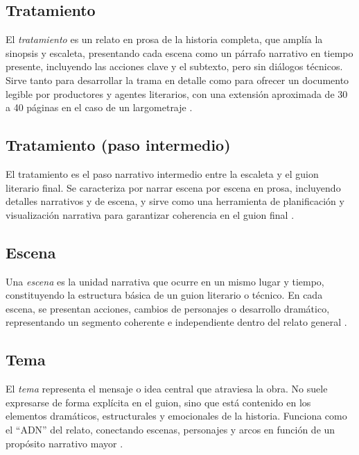 \documentclass[12pt]{article}
\begin{document}
	\subsection{Tratamiento}

	El \textit{tratamiento} es un relato en prosa de la historia completa, que amplía la sinopsis y escaleta, presentando cada escena como un párrafo narrativo en tiempo presente, incluyendo las acciones clave y el subtexto, pero sin diálogos técnicos. Sirve tanto para desarrollar la trama en detalle como para ofrecer un documento legible por productores y agentes literarios, con una extensión aproximada de 30 a 40 páginas en el caso de un largometraje \parencite{revista24cuadros_tratamiento,tratamiento_wikipedia}.

	\subsection{Tratamiento (paso intermedio)}

	El tratamiento es el paso narrativo intermedio entre la escaleta y el guion literario final. Se caracteriza por narrar escena por escena en prosa, incluyendo detalles narrativos y de escena, y sirve como una herramienta de planificación y visualización narrativa para garantizar coherencia en el guion final \parencite{unir_escaleta_tratamiento,tratamiento_wikipedia}.

	\subsection{Escena}

	Una \textit{escena} es la unidad narrativa que ocurre en un mismo lugar y tiempo, constituyendo la estructura básica de un guion literario o técnico. En cada escena, se presentan acciones, cambios de personajes o desarrollo dramático, representando un segmento coherente e independiente dentro del relato general \parencite{trottier_scene}.

	\subsection{Tema}

	El \textit{tema} representa el mensaje o idea central que atraviesa la obra. No suele expresarse de forma explícita en el guion, sino que está contenido en los elementos dramáticos, estructurales y emocionales de la historia. Funciona como el “ADN” del relato, conectando escenas, personajes y arcos en función de un propósito narrativo mayor \parencite{greenlight_theme,writingninja_theme}.
\end{document}
